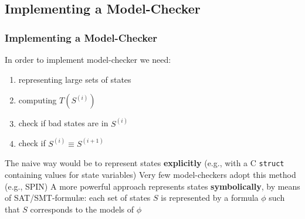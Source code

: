 \subsection{Implementing a Model-Checker}

\begin{frame}
  \frametitle{Implementing a Model-Checker}

  In order to implement model-checker we need: 
  \begin{enumerate}
    \item representing large sets of states
    \item computing $T(S^{(i)})$
    \item check if bad states are in $S^{(i)}$ 
    \item check if $S^{(i)} \equiv S^{(i+1)}$ 
  \end{enumerate}
  \vfill\pause
  The naive way would be to represent states {\bf explicitly} 
  (e.g., with a C {\tt struct} containing values for state variables)
  \vfill
  Very few model-checkers adopt this method (e.g., SPIN)
  \vfill\pause
  A more powerful approach represents 
  states {\bf symbolically}, 
  by means of SAT/SMT-formul\ae: each set of
  states $S$ is represented by a formula $\phi$ such
  that $S$ corresponds to the models of $\phi$

\end{frame}

